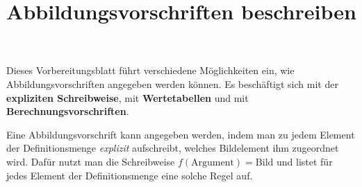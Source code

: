 \documentclass[]{uebungsblatt}
\title{Abbildungsvorschriften beschreiben}
\begin{document}
\maketitle
\begin{contents}
    Dieses Vorbereitungsblatt führt verschiedene Möglichkeiten ein, wie Abbildungsvorschriften angegeben werden können. Es beschäftigt sich mit der \textbf{expliziten Schreibweise}, mit \textbf{Wertetabellen} und mit \textbf{Berechnungsvorschriften}.
\end{contents}


\begin{remark}{}
    Eine Abbildungsvorschrift kann angegeben werden, indem man zu jedem Element der Definitionsmenge \emph{explizit} aufschreibt, welches Bildelement ihm zugeordnet wird. Dafür nutzt man die Schreibweise $f(\text{Argument})=\text{Bild}$ und listet für jedes Element der Definitionsmenge eine solche Regel auf.
\end{remark}
\end{document}
